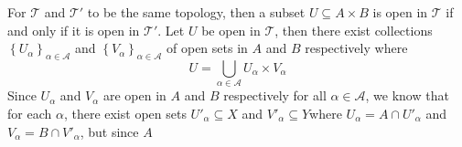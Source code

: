 \documentclass[12pt]{article}
\newcommand{\braces}[1]{\left\{#1\right\}}           %
\begin{document}
\pagestyle{fancy}
\fancyhead{}

\normalsize

For $\mathcal{T}$ and $\mathcal{T}'$ to be the same topology, then a subset $U\subseteq A\times B$ is open in $\mathcal{T}$ if and only if it is open in $\mathcal{T}'$. Let $U$ be open in $\mathcal{T}$, then there exist collections $\braces{U_\alpha}_{\alpha\in\mathcal{A}}$ and $\braces{V_\alpha}_{\alpha\in\mathcal{A}}$ of open sets in $A$ and $B$ respectively where
\[U=\bigcup_{\alpha\in\mathcal{A}}U_\alpha\times V_\alpha\]
Since $U_\alpha$ and $V_\alpha$ are open in $A$ and $B$ respectively for all $\alpha\in\mathcal{A}$, we know that for each $\alpha$, there exist open sets $U'_\alpha\subseteq X$ and $V'_\alpha\subseteq Y$where $U_\alpha=A\cap U'_\alpha$ and $V_\alpha=B\cap V'_\alpha$, but since $A$
\end{document}
